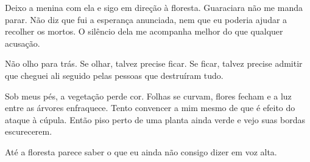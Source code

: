 Deixo a menina com ela e sigo em direção à floresta. Guaraciara não me manda parar. Não diz que fui a esperança anunciada, nem que eu poderia ajudar a recolher os mortos. O silêncio dela me acompanha melhor do que qualquer acusação.

Não olho para trás. Se olhar, talvez precise ficar. Se ficar, talvez precise admitir que cheguei ali seguido pelas pessoas que destruíram tudo.

Sob meus pés, a vegetação perde cor. Folhas se curvam, flores fecham e a luz entre as árvores enfraquece. Tento convencer a mim mesmo de que é efeito do ataque à cúpula. Então piso perto de uma planta ainda verde e vejo suas bordas escurecerem.

Até a floresta parece saber o que eu ainda não consigo dizer em voz alta.
